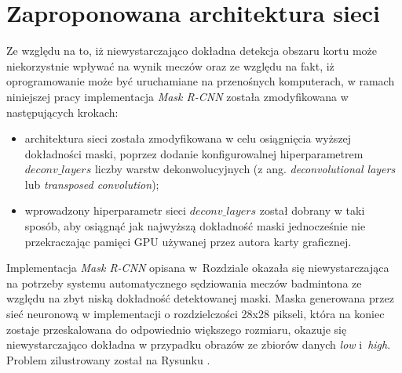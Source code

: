 \newpage
\section{Zaproponowana architektura sieci}
\label{sec:zaproponowana_architektura}

Ze względu na to, iż niewystarczająco dokładna detekcja obszaru kortu może niekorzystnie wpływać na wynik meczów oraz ze względu na fakt, iż oprogramowanie może być uruchamiane na przenośnych komputerach, w ramach niniejszej pracy implementacja \textit{Mask R-CNN} została zmodyfikowana w następujących krokach:

\begin{itemize}
	\item architektura sieci została zmodyfikowana w celu osiągnięcia wyższej dokładności maski, poprzez dodanie konfigurowalnej hiperparametrem $deconv\_layers$ liczby warstw dekonwolucyjnych (z ang. \textit{deconvolutional layers} lub \textit{transposed convolution});
	\item wprowadzony hiperparametr sieci $deconv\_layers$ został dobrany w taki sposób, aby osiągnąć jak najwyższą dokładność maski jednocześnie nie przekraczając pamięci GPU używanej przez autora karty graficznej.
\end{itemize}

Implementacja \textit{Mask R-CNN} opisana w~Rozdziale  okazała się niewystarczająca na potrzeby systemu automatycznego sędziowania meczów badmintona ze względu na zbyt niską dokładność detektowanej maski.
Maska generowana przez sieć neuronową w implementacji \cite{matterport-mask-rcnn} o rozdzielczości 28x28 pikseli, która na koniec zostaje przeskalowana do odpowiednio większego rozmiaru, okazuje się niewystarczająco dokładna w przypadku obrazów ze zbiorów danych \textit{low} i~\textit{high}.
Problem zilustrowany został na Rysunku . 

